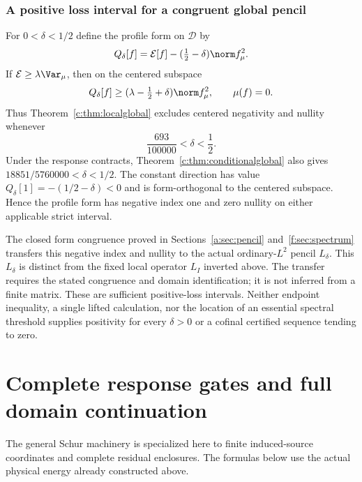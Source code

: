 \documentclass[11pt,a4paper]{article}
\numberwithin{equation}{section}
\theoremstyle{definition}\newtheorem{definition}[theorem]{Definition}
\theoremstyle{remark}\newtheorem{remark}[theorem]{Remark}
\newcommand{\E}{\mathcal E}\newcommand{\D}{\mathcal D}
\begin{document}
\subsubsection{A positive loss interval for a congruent global pencil}
For $0<\delta<1/2$ define the profile form on $\D$ by
\[
 Q_\delta[f]=\E[f]-(\tfrac12-\delta)\norm f_\mu^2.
\]
If $\E\ge\lambda\Var_\mu$, then on the centered subspace
\[
 Q_\delta[f]\ge(\lambda-\tfrac12+\delta)\norm f_\mu^2,
 \qquad\mu(f)=0.
\]
Thus Theorem~\ref{c:thm:localglobal} excludes centered negativity and nullity whenever
\begin{equation}\label{c:eq:pencilinterval}
 \frac{693}{100000}<\delta<\frac12.
\end{equation}
Under the response contracts, Theorem~\ref{c:thm:conditionalglobal} also gives
$18851/5760000<\delta<1/2$.
The constant direction has value $Q_\delta[1]=-(1/2-\delta)<0$ and is form-orthogonal to the centered subspace. Hence the profile form has negative index one and zero nullity on either applicable strict interval.

The closed form congruence proved in Sections~\ref{a:sec:pencil} and~\ref{f:sec:spectrum} transfers this negative index and nullity to the actual ordinary-$L^2$ pencil $L_\delta$.
This $L_\delta$ is distinct from the fixed local operator $L_I$ inverted above.
The transfer requires the stated congruence and domain identification; it is not inferred from a finite matrix.
These are sufficient positive-loss intervals. Neither endpoint inequality, a single lifted calculation, nor the location of an essential spectral threshold supplies positivity for every $\delta>0$ or a cofinal certified sequence tending to zero.


\section{Complete response gates and full domain continuation}\label{sec:verified-response}
The general Schur machinery is specialized here to finite induced-source coordinates and complete residual enclosures. The formulas below use the actual physical energy already constructed above.
\end{document}
